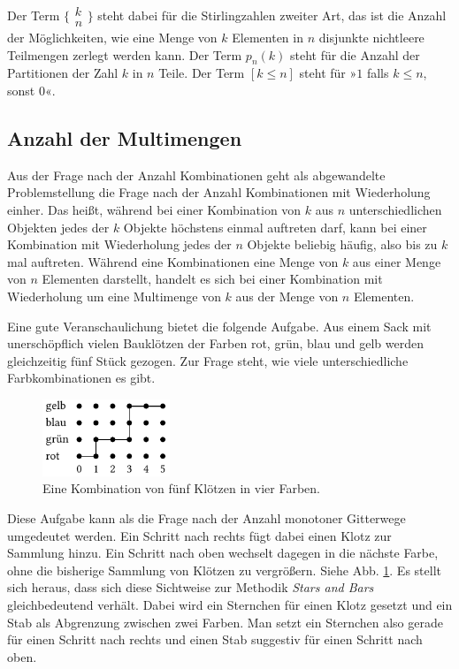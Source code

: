 Der Term $\big\{\!\begin{smallmatrix}k\\ n\end{smallmatrix}\!\big\}$
steht dabei für die Stirlingzahlen zweiter Art, das ist die Anzahl der
Möglichkeiten, wie eine Menge von $k$ Elementen in $n$ disjunkte nichtleere
Teilmengen zerlegt werden kann. Der Term $p_n(k)$ steht für die Anzahl
der Partitionen der Zahl $k$ in $n$ Teile. Der Term $[k\le n]$ steht
für »$1$ falls $k\le n$, sonst $0$«.

\subsection{Anzahl der Multimengen}

Aus der Frage nach der Anzahl Kombinationen geht als abgewandelte
Problemstellung die Frage nach der Anzahl Kombinationen mit
Wiederholung einher. Das heißt, während bei einer Kombination von
$k$ aus $n$ unterschiedlichen Objekten jedes der $k$ Objekte höchstens
einmal auftreten darf, kann bei einer Kombination mit Wiederholung
jedes der $n$ Objekte beliebig häufig, also bis zu $k$ mal auftreten.
Während eine Kombinationen eine Menge von $k$ aus einer Menge von $n$
Elementen darstellt, handelt es sich bei einer Kombination mit
Wiederholung um eine Multimenge von $k$ aus der Menge von $n$ Elementen.

Eine gute Veranschaulichung bietet die folgende Aufgabe.
Aus einem Sack mit unerschöpflich vielen Bauklötzen der Farben rot, grün,
blau und gelb werden gleichzeitig fünf Stück gezogen. Zur Frage steht,
wie viele unterschiedliche Farbkombinationen es gibt.

\begin{figure}\setlength{\abovecaptionskip}{0pt}
\begin{center}
\includegraphics[width=38mm]{img/Kloetze.pdf}
\caption{Eine Kombination von fünf Klötzen in vier Farben.}
\label{fig:Kloetze}
\end{center}
\end{figure}

Diese Aufgabe kann als die Frage nach der Anzahl monotoner Gitterwege
umgedeutet werden. Ein Schritt nach rechts fügt dabei einen Klotz zur
Sammlung hinzu. Ein Schritt nach oben wechselt dagegen in die nächste Farbe,
ohne die bisherige Sammlung von Klötzen zu vergrößern.
Siehe Abb. \ref{fig:Kloetze}. Es stellt sich heraus, dass sich diese Sichtweise
zur Methodik \emph{Stars and Bars} gleichbedeutend verhält. Dabei wird
ein Sternchen für einen Klotz gesetzt und ein Stab als Abgrenzung
zwischen zwei Farben. Man setzt ein Sternchen also gerade für einen
Schritt nach rechts und einen Stab suggestiv für einen Schritt
nach oben.

